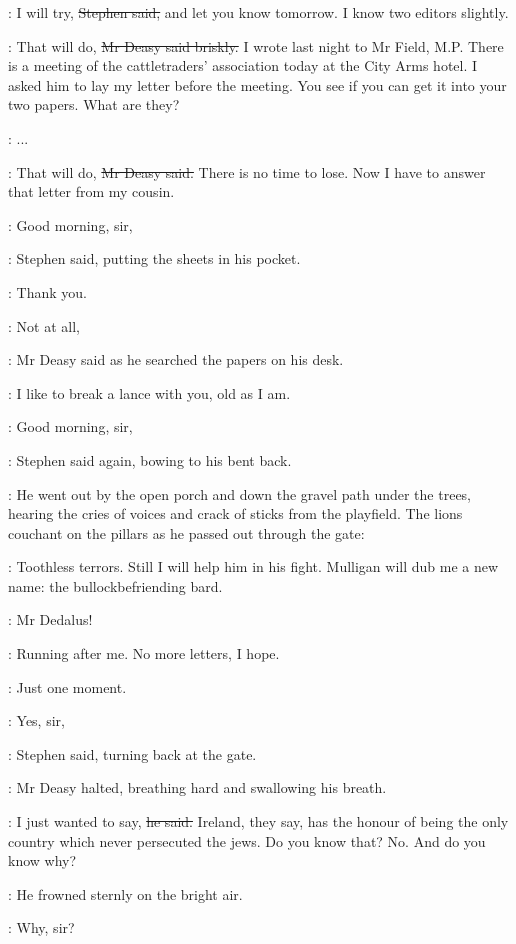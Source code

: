\Stephen:
I will try, \sout{Stephen said,}
and let you know tomorrow.
I know two editors slightly.

\deasy:
That will do, \sout{Mr Deasy said briskly.}
I wrote last night to Mr Field, M.P.
There is a meeting of the cattletraders' association today
at the City Arms hotel.
I asked him to lay my letter before the meeting.
You see if you can get it into your two papers.
What are they?

\Stephen:
 ...

\deasy:
That will do, \sout{Mr Deasy said.}
There is no time to lose.
Now I have to answer that letter from my cousin.

\Stephen:
Good morning, sir,

:
Stephen said, putting the sheets in his pocket.

\Stephen:
Thank you.

\deasy:
Not at all,

:
Mr Deasy said as he searched the papers on his desk.

\deasy:
I like to break a lance with you, old as I am.

\Stephen:
Good morning, sir,

:
Stephen said again, bowing to his bent back.

:
He went out by the open porch and down the gravel path under the trees,
hearing the cries of voices and crack of sticks from the playfield.
The lions couchant on the pillars as he passed out through the gate:

\StephenInt:
Toothless terrors.
Still I will help him in his fight.
Mulligan will dub me a new name: the bullockbefriending bard.

\deasy:
Mr Dedalus!

\StephenInt:
Running after me.
No more letters, I hope.

\deasy:
Just one moment.

\Stephen:
Yes, sir,

:
Stephen said, turning back at the gate.

:
Mr Deasy halted, breathing hard and swallowing his breath.

\deasy:
I just wanted to say, \sout{he said.}
Ireland, they say, has the honour of being the only country
which never persecuted the jews.
Do you know that?
No.
And do you know why?

:
He frowned sternly on the bright air.

\Stephen:
Why, sir?

